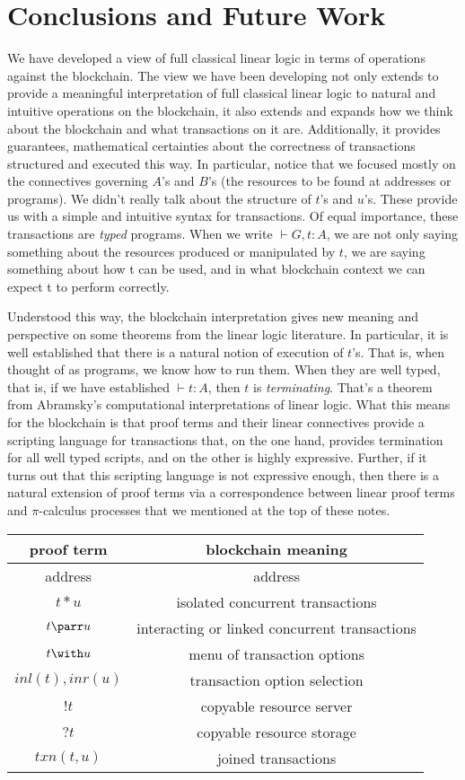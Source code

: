 \documentclass[fleqn]{acm_proc_article-sp}
\numberwithin{equation}{subsection}
\begin{document}
\section{Conclusions and Future Work}

We have developed a view of full classical linear logic in terms of
operations against the blockchain. The view we have been developing
not only extends to provide a meaningful interpretation of full
classical linear logic to natural and intuitive operations on the
blockchain, it also extends and expands how we think about the
blockchain and what transactions on it are. Additionally, it provides
guarantees, mathematical certainties about the correctness of
transactions structured and executed this way. In particular, notice
that we focused mostly on the connectives governing $A$'s and $B$'s (the
resources to be found at addresses or programs). We didn't really talk
about the structure of $t$'s and $u$'s. These provide us with a simple and
intuitive syntax for transactions. Of equal importance, these
transactions are \emph{typed} programs. When we write $\vdash G, t : A$, we are
not only saying something about the resources produced or manipulated
by $t$, we are saying something about how t can be used, and in what
blockchain context we can expect t to perform correctly.

Understood this way, the blockchain interpretation gives new meaning
and perspective on some theorems from the linear logic literature. In
particular, it is well established that there is a natural notion of
execution of $t$'s. That is, when thought of as programs, we know how
to run them. When they are well typed, that is, if we have established
$\vdash t : A$, then $t$ is \emph{terminating}. That's a theorem from
Abramsky's computational interpretations of linear logic. What this
means for the blockchain is that proof terms and their linear
connectives provide a scripting language for transactions that, on the
one hand, provides termination for all well typed scripts, and on the
other is highly expressive. Further, if it turns out that this
scripting language is not expressive enough, then there is a natural
extension of proof terms via a correspondence between linear proof
terms and {$\pi$}-calculus processes that we mentioned at the top of these
notes.


\begin{tabular}{c|c}
  proof term & blockchain meaning \\
  \hline
  address & address \\
  $t * u$ & isolated concurrent transactions \\
  $t \parr u$ & interacting or linked concurrent transactions \\
  $t \with u$ & menu of transaction options \\
  $inl( t ), inr( u )$ & transaction option selection \\
  $!t$ & copyable resource server \\
  $?t$ & copyable resource storage \\
  $txn( t, u )$ & joined transactions\\
\end{tabular}
\end{document}
